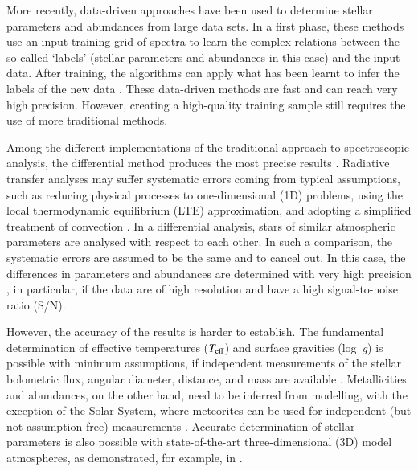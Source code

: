 \documentclass{aa}
\def\teff{$\textit{T}_{\rm{eff}}$}
\def\logg{\mbox{log~{\it g}}}
\begin{document}
More recently, data-driven approaches have been used to determine stellar parameters and abundances from large data sets. In a first phase, these methods use an input training grid of spectra to learn the complex relations between the so-called `labels' (stellar parameters and abundances in this case) and the input data. After training, the algorithms can apply what has been learnt to infer the labels of the new data \citep[see e.g.][]{Ness2015, Fabbro18, LeungBovy2019, Ting2019, Xiang2019, Guiglion2020, OBriain2021, Li2022, Nepal2023, Candebat2024, Sizemore24}. These data-driven methods are fast and can reach very high precision. However, creating a high-quality training sample still requires the use of more traditional methods. 

Among the different implementations of the traditional approach to spectroscopic analysis, the differential method produces the most precise results \citep[see e.g.][]{Bedell2014, Nissen2018}. Radiative transfer analyses may suffer systematic errors coming from typical assumptions, such as reducing physical processes to one-dimensional (1D) problems, using the local thermodynamic equilibrium (LTE) approximation, and adopting a simplified treatment of convection \citep[see e.g.][for reviews on these topics]{KupkaMuthsam2017, JoyceTayar2023, LindAmarsi2024}. In a differential analysis, stars of similar atmospheric parameters are analysed with respect to each other. In such a comparison, the systematic errors are assumed to be the same and to cancel out. In this case, the differences in parameters and abundances are determined with very high precision \citep[below 0.01 dex for abundances, see e.g.][]{Bedell2014}, in particular, if the data are of high resolution and have a high signal-to-noise ratio (S/N). 

However, the accuracy of the results is harder to establish. The fundamental determination of effective temperatures (\teff) and surface gravities (\logg) is possible with minimum assumptions, if independent measurements of the stellar bolometric flux, angular diameter, distance, and mass are available \citep[e.g.][]{Boyajian2013, Creevey2015, Kiman2024, 2024A&A...682A.145S, Pinsonneault2024}. Metallicities and abundances, on the other hand, need to be inferred from modelling, with the exception of the Solar System, where meteorites can be used for independent (but not assumption-free) measurements \citep{Alexander2019, Lodders2021}. Accurate determination of stellar parameters is also possible with state-of-the-art three-dimensional (3D) model atmospheres, as demonstrated, for example, in \citet{2021A&A...650A.194G, 2023A&A...679A.110G}.
\end{document}
